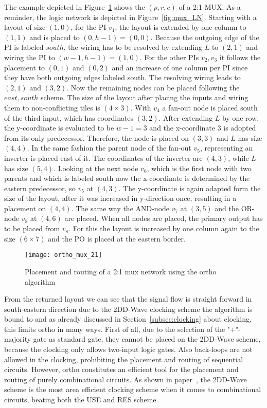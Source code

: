The example depicted in Figure~\ref{fig:ortho_mux_21} shows the $(p, r, c)$ of a 2:1 MUX. As a reminder, the logic network is depicted in Figure~\ref{fig:mux_LN}. Starting with a layout of size $(1, 0)$, for the PI $v_1$, the layout is extended by one column to $(1, 1)$ and is placed to $(0, h-1) = (0, 0)$. Because the outgoing edge of the PI is labeled $south$, the wiring has to be resolved by extending $L$ to $(2, 1)$ and wiring the PI to $(w-1, h-1)=(1, 0)$. For the other PIs $v_2, v_3$ it follows the placement to $(0, 1)$ and $(0, 2)$ and an increase of one column per PI since they have both outgoing edges labeled south. The resolving wiring leads to $(2, 1)$ and $(3, 2)$. Now the remaining nodes can be placed following the $east, south$ scheme. The size of the layout after placing the inputs and wiring them to non-conflicting tiles is $(4 \times 3)$. With $v_4$ a fan-out node is placed south of the third input, which has coordinates $(3, 2)$. After extending $L$ by one row, the y-coordinate is evaluated to be $w-1 = 3$ and the x-coordinate $3$ is adopted from its only predecessor. Therefore, the node is placed on $(3, 3)$ and $L$ has size $(4, 4)$. In the same fashion the parent node of the fan-out $v_5$, representing an inverter is placed east of it. The coordinates of the inverter are $(4, 3)$, while $L$ has size $(5, 4)$. Looking at the next node $v_6$, which is the first node with two parents and which is labeled south now the x-coordinate is determined by the eastern predecessor, so $v_5$ at $(4, 3)$. The y-coordinate is again adapted form the size of the layout, after it was increased in y-direction once, resulting in a placement on $(4, 4)$. The same way the AND-node $v_7$ at $(3, 5)$ and the OR-node $v_8$ at $(4, 6)$ are placed. When all nodes are placed, the primary output has to be placed from $v_8$. For this the layout is increased by one column again to the size $(6 \times 7)$ and the PO is placed at the eastern border.

\begin{figure}
	\centering
	\texttt{[image: ortho\_mux\_21]}
	\caption{Placement and routing of a 2:1 mux network using the ortho algorithm}\label{fig:ortho_mux_21}
\end{figure}

From the returned layout we can see that the signal flow is straight forward in south-eastern direction due to the 2DD-Wave clocking scheme the algorithm is bound to and as already discussed in Section~\ref{subsec:clocking} about clocking, this limits ortho in many ways. First of all, due to the selection of the "+"-majority gate as standard gate, they cannot be placed on the 2DD-Wave scheme, because the clocking only allows two-input logic gates. Also back-loops are not allowed in the clocking, prohibiting the placement and routing of sequential circuits. However, ortho constitutes an efficient tool for the placement and routing of purely combinational circuits. As shown in paper~\cite{walter2018exact}, the 2DD-Wave scheme is the most area efficient clocking scheme when it comes to combinational circuits, beating both the USE and RES scheme.

